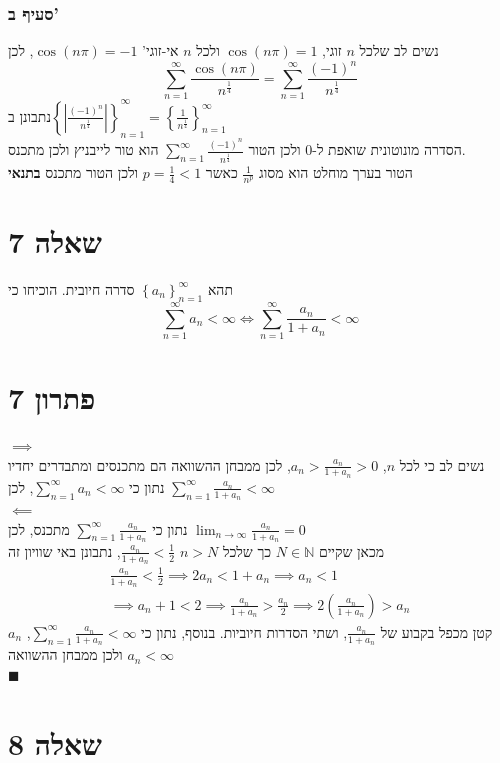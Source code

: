 \documentclass[12pt, titlepage]{article}
\begin{document}
\section*{סעיף ב'}
נשים לב שלכל $n$ זוגי, $\cos\left(n\pi\right)=1$ ולכל $n$ אי-זוגי' $\cos\left(n\pi\right)=-1$, לכן
\[
    \sum_{n=1}^\infty \frac{\cos \left(n\pi\right)}{n^{\frac{1}{4}}} = \sum_{n=1}^\infty \frac{\left(-1\right)^{n}}{n^{\frac{1}{4}}} 
\]
נתבונן ב$\left\{\left|\frac{\left(-1\right)^n}{n^{\frac{1}{4}}}\right|\right\}^\infty_{n=1}=\left\{ \frac{1}{n^{\frac{1}{4}}}\right\}^\infty_{n=1}$\\
הסדרה מונוטונית שואפת ל-$0$ ולכן הטור $\sum_{n=1}^\infty \frac{\left(-1\right)^{n}}{n^{\frac{1}{4}}}$ הוא טור לייבניץ ולכן מתכנס.\\
הטור בערך מוחלט הוא מסוג $\frac{1}{n^p}$ כאשר $p=\frac{1}{4} <1$ ולכן הטור מתכנס \textbf{בתנאי}
\newpage
\part*{שאלה 7}
תהא $\left\{a_n\right\}^\infty_{n=1}$ סדרה חיובית. הוכיחו כי
\[
	\sum_{n=1}^\infty a_n < \infty \iff \sum_{n=1}^\infty \frac{a_n}{1+a_n} < \infty
\]
\part*{פתרון 7}
$\implies$\\
נשים לב כי לכל $n$, $a_n > \frac{a_n}{1+a_n} > 0$, לכן ממבחן ההשוואה הם מתכנסים ומתבדרים יחדיו\\
נתון כי $\sum_{n=1}^\infty a_n < \infty$, לכן $\sum_{n=1}^\infty \frac{a_n}{1+a_n} < \infty$\\
$\impliedby$\\
נתון כי $\sum_{n=1}^{\infty} \frac{a_n}{1+a_n}$ מתכנס, לכן $\lim_{n\to\infty}\frac{a_n}{1+a_n}=0$\\
מכאן שקיים $N\in\mathbb{N}$ כך שלכל $n>N$ $\frac{a_n}{1+a_n} < \frac{1}{2}$, נתבונן באי שוויון זה
\begin{gather*}
    \frac{a_n}{1+a_n} < \frac{1}{2} \implies 2a_n < 1+a_n \implies a_n < 1 \\
    \implies a_n + 1 < 2  \implies \frac{a_n}{1+a_n} > \frac{a_n}{2} \implies 2\left(\frac{a_n}{1+a_n}\right) > a_n
\end{gather*}
$a_n$ קטן מכפל בקבוע של $\frac{a_n}{1+a_n}$, ושתי הסדרות חיוביות. בנוסף, נתון כי $\sum_{n=1}^\infty \frac{a_n}{1+a_n} < \infty$, ולכן ממבחן ההשוואה $a_n < \infty$\\
$\blacksquare$
\newpage
\part*{שאלה 8}
\end{document}

